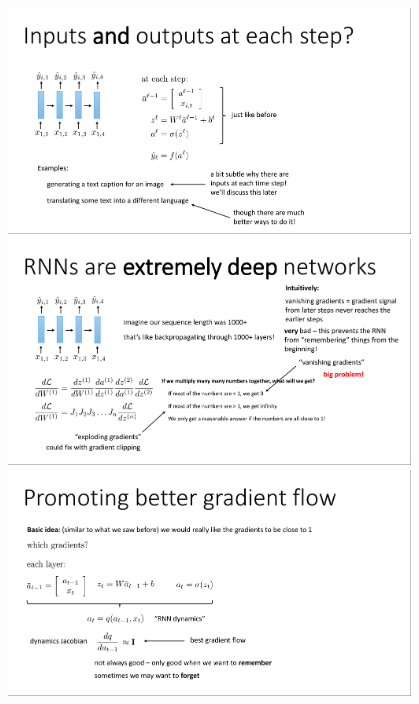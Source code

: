 \documentclass{book}
\begin{document}
\begin{figure}[H]
    \centering
    \includegraphics[width=0.95\textwidth]{images/lec10_10.png}
    \includegraphics[width=0.95\textwidth]{images/lec10_11.png}
    \includegraphics[width=0.95\textwidth]{images/lec10_12.png}
\end{figure}
\end{document}
